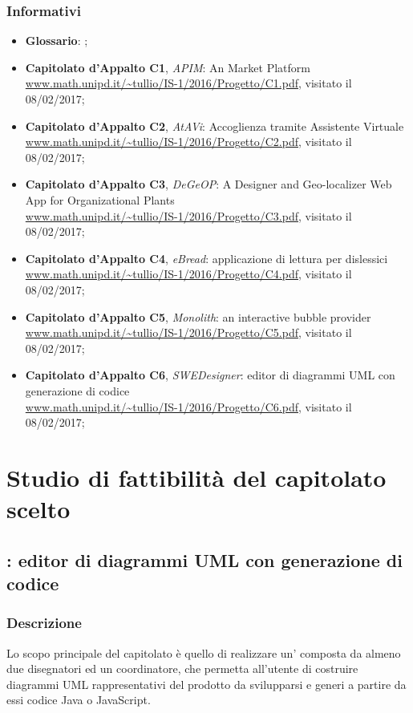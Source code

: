 		\subsubsection{Informativi}
		\begin{itemize}
			\item \textbf{Glossario}: \Glossario;
			\item \textbf{Capitolato d'Appalto C1}, \emph{APIM}: An  Market Platform \\
			\url{www.math.unipd.it/~tullio/IS-1/2016/Progetto/C1.pdf}, visitato il 08/02/2017;
			\item \textbf{Capitolato d'Appalto C2}, \emph{AtAVi}: Accoglienza tramite Assistente Virtuale \\
			\url{www.math.unipd.it/~tullio/IS-1/2016/Progetto/C2.pdf}, visitato il 08/02/2017;
			\item \textbf{Capitolato d'Appalto C3}, \emph{DeGeOP}: A Designer and Geo-localizer Web App for Organizational Plants \\
			\url{www.math.unipd.it/~tullio/IS-1/2016/Progetto/C3.pdf}, visitato il 08/02/2017;
			\item \textbf{Capitolato d'Appalto C4}, \emph{eBread}: applicazione di lettura per dislessici \\
			\url{www.math.unipd.it/~tullio/IS-1/2016/Progetto/C4.pdf}, visitato il 08/02/2017;
			\item \textbf{Capitolato d'Appalto C5}, \emph{Monolith}: an interactive bubble provider \\
			\url{www.math.unipd.it/~tullio/IS-1/2016/Progetto/C5.pdf}, visitato il 08/02/2017;
			\item \textbf{Capitolato d'Appalto C6}, \emph{SWEDesigner}: editor di diagrammi UML con generazione di codice \\
			\url{www.math.unipd.it/~tullio/IS-1/2016/Progetto/C6.pdf}, visitato il 08/02/2017;
		\end{itemize}


	
\section{Studio di fattibilità del capitolato scelto}
	\subsection{\proj: editor di diagrammi UML con generazione di codice}
		\subsubsection{Descrizione}
		Lo scopo principale del capitolato è quello di realizzare un' composta da almeno due disegnatori
		ed un coordinatore, che permetta all'utente di costruire diagrammi UML rappresentativi del prodotto da svilupparsi e generi a partire da essi codice Java o JavaScript.
		

